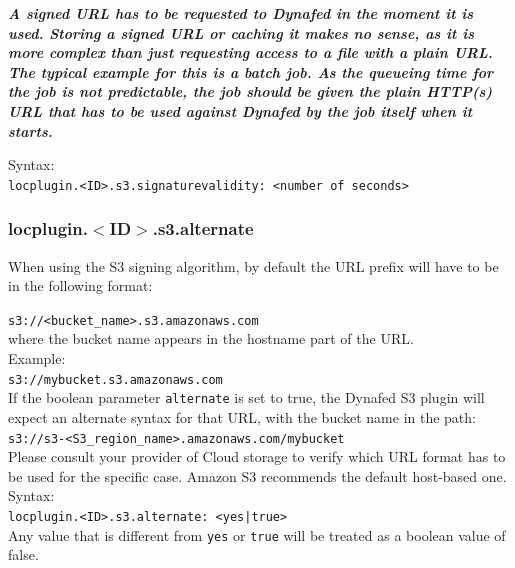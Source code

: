 \documentclass[12pt]{article} %
\begin{document}
\textit{\textbf{A signed URL has to be requested to Dynafed in the moment it is used. Storing a signed URL or caching it makes no sense, as it
is more complex than just requesting access to a file with a plain URL.\\
The typical example for this is a batch job. As the queueing time for the job is not predictable, the job should
be given the plain HTTP(s) URL that has to be used against Dynafed by the job itself when it starts.\\}}

Syntax:\\
\lstinline"locplugin.<ID>.s3.signaturevalidity: <number of seconds>"\\

\subsubsection{locplugin.$<$ID$>$.s3.alternate}
When using the S3 signing algorithm, by default the URL prefix will have to be in the following format:

\lstinline"s3://<bucket_name>.s3.amazonaws.com"\\

where the bucket name appears in the hostname part of the URL.\\

Example:\\

\lstinline"s3://mybucket.s3.amazonaws.com"\\

 
If the boolean parameter \lstinline"alternate" is set to true, the Dynafed S3 plugin
will expect an alternate syntax for that URL, with the bucket name in the path:\\
 
\lstinline"s3://s3-<S3_region_name>.amazonaws.com/mybucket"\\

Please consult your provider of Cloud storage to verify which URL format has to be used for the specific case. Amazon S3 recommends the default host-based one.\\

Syntax:\\
\lstinline"locplugin.<ID>.s3.alternate: <yes|true>"\\
Any value that is different from \lstinline"yes" or \lstinline"true" will be treated as a boolean value of false.\\
\end{document}

